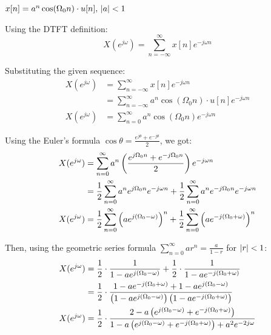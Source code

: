 \documentclass[a4paper, 10pt]{article}
\begin{document}
\newpage

\begin{tosubmit}
\begin{subsubproblems}[start=2]
    \item \( x[n] = a^{n} \cos (\Omega_0 n) \cdot  u[n] , \, \left|a\right| < 1 \)
\end{subsubproblems}

\par\noindent\submitsolution
Using the DTFT definition:
\[ X(e^{j\omega}) = \sum_{n=-\infty}^{\infty} x[n] e^{-j\omega n} \]

Substituting the given sequence:
\begin{align*}
    X(e^{j\omega}) &= \sum_{n=-\infty}^{\infty} x[n] e^{-j\omega n} \\
    &= \sum_{n=-\infty}^{\infty} a^{n} \cos (\Omega_0 n) \cdot  u[n] e^{-j\omega n} \\
    X(e^{j\omega}) &= \sum_{n=0}^{\infty} a^{n} \cos (\Omega_0 n) e^{-j\omega n}
\end{align*}

Using the Euler's formula \( \cos{\theta} = \frac{e^{j\theta} + e^{-j\theta}}{2} \), we got:
\begin{align*}
    X(e^{j\omega}) &= \sum_{n=0}^{\infty} a^{n} \left( \frac{e^{j \Omega_0 n} + e^{-j \Omega_0 n}}{2} \right) e^{-j\omega n} \\
    &= \frac{1}{2} \sum_{n=0}^{\infty} a^{n} e^{j \Omega_0 n} e^{-j\omega n} + \frac{1}{2} \sum_{n=0}^{\infty} a^{n} e^{-j \Omega_0 n} e^{-j\omega n} \\
    X(e^{j\omega}) &= \frac{1}{2} \sum_{n=0}^{\infty} \left( a e^{j (\Omega_0 - \omega)} \right)^{n} + \frac{1}{2} \sum_{n=0}^{\infty} \left( a e^{-j (\Omega_0 + \omega)} \right)^{n}
\end{align*}

Then, using the geometric series formula \( \sum_{n=0}^{\infty} ar^n = \frac{a}{1 - r} \) for \( \left|r\right| < 1 \):
\begin{align*}
    X(e^{j\omega}) &= \frac{1}{2} \cdot \frac{1}{1 - a e^{j (\Omega_0 - \omega)}} + \frac{1}{2} \cdot \frac{1}{1 - a e^{-j (\Omega_0 + \omega)}} \\
    &= \frac{1}{2} \cdot \frac{1 - a e^{-j (\Omega_0 + \omega)} + 1 - a e^{j (\Omega_0 - \omega)}}{\left( 1 - a e^{j (\Omega_0 - \omega)} \right) \left( 1 - a e^{-j (\Omega_0 + \omega)} \right)} \\
    X(e^{j\omega}) &= \frac{1}{2} \cdot \frac{ 2 - a \left( e^{j (\Omega_0 - \omega)} + e^{-j (\Omega_0 + \omega)} \right) }{1 - a \left( e^{j (\Omega_0 - \omega)} + e^{-j (\Omega_0 + \omega)} \right) + a^2 e^{-2j\omega}}
\end{align*}


\end{tosubmit}
\end{document}
